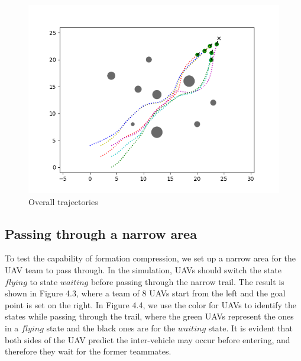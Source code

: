 \begin{figure}[H]
    \centering
    \includegraphics[scale=0.7]{figures/exp1-3.png}
    \caption{Overall trajectories}
    \label{fig:fig_label}
\end{figure}

\subsection{Passing through a narrow area}
To test the capability of formation compression, we set up a narrow area for the UAV team to pass through. In the simulation, UAVs should switch the state $flying$ to state $waiting$ before passing through the narrow trail. The result is shown in Figure 4.3, where a team of 8 UAVs start from the left and the goal point is set on the right. In Figure 4.4, we use the color for UAVs to identify the states while passing through the trail, where the green UAVs represent the ones in a $flying$ state and the black ones are for the $waiting$ state. It is evident that both sides of the UAV predict the inter-vehicle may occur before entering, and therefore they wait for the former teammates.

